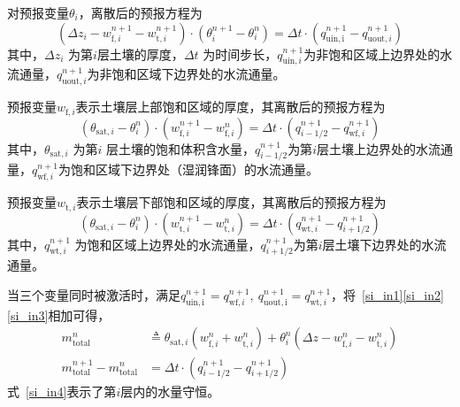 对预报变量$\theta_i$，离散后的预报方程为
\begin{equation}\label{si_in1}
  \left(\Delta z_{i}-w_{\mathrm{f},i}^{n+1}-w_{\mathrm{t},i}^{n+1}\right) \cdot\left(\theta_{i}^{n+1}-\theta_{i}^{n}\right)=\Delta t \cdot\left(q_{\mathrm{ {uin,i }}}^{n+1}-q_{\mathrm{uout},i}^{n+1}\right)
\end{equation}
其中，$\Delta z_i$ 为第$ i $层土壤的厚度，$\Delta t$ 为时间步长，$q_{\mathrm{uin},i}^{n+1}$为非饱和区域上边界处的水流通量，$q_{\mathrm{uout},i}^{n+1}$为非饱和区域下边界处的水流通量。


预报变量$w_{\mathrm{f},i}$表示土壤层上部饱和区域的厚度，其离散后的预报方程为
\begin{equation}\label{si_in2}
  \left(\theta_{\mathrm{sat},i}-\theta_{i}^{n}\right) \cdot\left(w_{\mathrm{f},i}^{n+1}-w_{\mathrm{f},i}^{n}\right)=\Delta t \cdot\left(q_{i-1/2}^{n+1}-q_{\mathrm{w f},i}^{n+1}\right)
\end{equation}
其中，$\theta_{\mathrm{sat},i}$ 为第$ i$ 层土壤的饱和体积含水量，$ q_{{i-1/2}}^{n+1}$为第$i$层土壤上边界处的水流通量，$q_{\mathrm{wf},i}^{n+1}$为饱和区域下边界处（湿润锋面）的水流通量。


预报变量$w_{\mathrm{t},i}$表示土壤层下部饱和区域的厚度，其离散后的预报方程为
\begin{equation}\label{si_in3}
  \left(\theta_{\mathrm{sat},i}-\theta_{i}^{n}\right) \cdot\left(w_{\mathrm{t},i}^{n+1}-w_{\mathrm{t},i}^{n}\right)=\Delta t \cdot\left(q_{\mathrm{w t},i}^{n+1}-q_{i+1 / 2}^{n+1}\right)
\end{equation}
其中，$q_{\mathrm{wt},i}^{n+1}$  为饱和区域上边界处的水流通量，$q_{i+1/2}^{n+1}$为第$i$层土壤下边界处的水流通量。

当三个变量同时被激活时，满足$q_{\mathrm{ {uin,i }}}^{n+1}=q_{\mathrm{w f},i}^{n+1},~ q_{\mathrm{ {uout,i }}}^{n+1}=q_{\mathrm{wt},i}^{n+1}$，将~\eqref{si_in1}\eqref{si_in2}\eqref{si_in3}相加可得，
\begin{equation}\label{si_in4}
  \begin{aligned}
    m_{\mathrm{total}}^n & \triangleq \theta_{\mathrm{sat},i}\left(w_{\mathrm{f},i}^n+w_{\mathrm{t},i}^{n}\right)+\theta_{i}^{n}\left(\Delta z - w_{\mathrm{f},i}^{n} - w_{\mathrm{t},i}^{n}\right) \\
    m_{\mathrm{total}}^{n+1} - m_{\mathrm{total}}^n & =\Delta t \cdot\left(q_{i-1/2}^{n+1}-q_{i+1 / 2}^{n+1}\right)
  \end{aligned}
\end{equation}
式~\eqref{si_in4}表示了第$i$层内的水量守恒。

